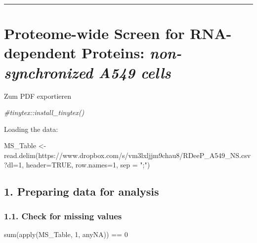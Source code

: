 \documentclass[
]{article}
\author{}
\date{\vspace{-2.5em}}
\newenvironment{Shaded}{\begin{snugshade}}{\end{snugshade}}
\newcommand{\AttributeTok}[1]{\textcolor[rgb]{0.77,0.63,0.00}{#1}}
\newcommand{\CommentTok}[1]{\textcolor[rgb]{0.56,0.35,0.01}{\textit{#1}}}
\newcommand{\ConstantTok}[1]{\textcolor[rgb]{0.00,0.00,0.00}{#1}}
\newcommand{\DecValTok}[1]{\textcolor[rgb]{0.00,0.00,0.81}{#1}}
\newcommand{\FunctionTok}[1]{\textcolor[rgb]{0.00,0.00,0.00}{#1}}
\newcommand{\NormalTok}[1]{#1}
\newcommand{\OtherTok}[1]{\textcolor[rgb]{0.56,0.35,0.01}{#1}}
\newcommand{\SpecialCharTok}[1]{\textcolor[rgb]{0.00,0.00,0.00}{#1}}
\newcommand{\StringTok}[1]{\textcolor[rgb]{0.31,0.60,0.02}{#1}}
\begin{document}
\begin{center}\rule{0.5\linewidth}{0.5pt}\end{center}

\hypertarget{proteome-wide-screen-for-rna-dependent-proteins-non-synchronized-a549-cells}{%
\section{\texorpdfstring{Proteome-wide Screen for RNA-dependent
Proteins: \emph{non-synchronized A549
cells}}{Proteome-wide Screen for RNA-dependent Proteins: non-synchronized A549 cells}}\label{proteome-wide-screen-for-rna-dependent-proteins-non-synchronized-a549-cells}}

Zum PDF exportieren

\begin{Shaded}
\begin{Highlighting}[]
\CommentTok{\#tinytex::install\_tinytex()}
\end{Highlighting}
\end{Shaded}

Loading the data:

\begin{Shaded}
\begin{Highlighting}[]
\NormalTok{MS\_Table }\OtherTok{\textless{}{-}} \FunctionTok{read.delim}\NormalTok{(}\StringTok{\textquotesingle{}https://www.dropbox.com/s/vm3lxljjm9chau8/RDeeP\_A549\_NS.csv?dl=1\textquotesingle{}}\NormalTok{, }\AttributeTok{header=}\ConstantTok{TRUE}\NormalTok{, }\AttributeTok{row.names=}\DecValTok{1}\NormalTok{, }\AttributeTok{sep =} \StringTok{";"}\NormalTok{)}
\end{Highlighting}
\end{Shaded}

\hypertarget{preparing-data-for-analysis}{%
\subsection{1. Preparing data for
analysis}\label{preparing-data-for-analysis}}

\hypertarget{check-for-missing-values}{%
\subsubsection{1.1. Check for missing
values}\label{check-for-missing-values}}

\begin{Shaded}
\begin{Highlighting}[]
\FunctionTok{sum}\NormalTok{(}\FunctionTok{apply}\NormalTok{(MS\_Table, }\DecValTok{1}\NormalTok{, anyNA)) }\SpecialCharTok{==} \DecValTok{0}
\end{Highlighting}
\end{Shaded}
\end{document}
